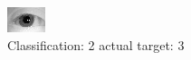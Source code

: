 \begin{figure}[h!]
\begin{center}
\includegraphics[width=0.60\columnwidth]{figures/ID1086_class_2_target_3.png}
\end{center}
\caption{ Classification: 2 actual target: 3}
\label{fig:ID1086_class_2_target_3}
\end{figure}
